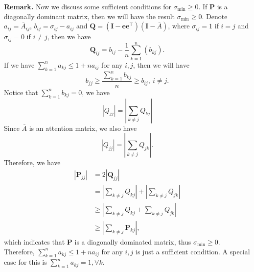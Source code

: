 \documentclass{article}
\def\ve{{\bm{e}}}
\def\mI{{\bm{I}}}
\def\mP{{\bm{P}}}
\def\mQ{{\bm{Q}}}
\theoremstyle{definition}
\theoremstyle{remark}
\theoremstyle{theorem}
\begin{document}
\textbf{Remark.} Now we discuss some sufficient conditions for $\sigma_{\min}\geq0.$ If $\mP$ is a diagonally dominant matrix, then we will have the result $\sigma_{\min}\geq0.$ Denote $a_{ij}=\bar{A}_{ij}$, $b_{ij}=\sigma_{ij}-a_{ij}$ and $\mQ=(\mI-\ve\ve^{\top})(\mI-\bar{A})$, where $\sigma_{ij}=1$ if $i=j$ and $\sigma_{ij}=0$ if $i\neq j$, then we have
\begin{equation}
    \mQ_{ij}=b_{ij}-\frac{1}{n}\sum_{k=1}^n(b_{kj}).
\end{equation}
If we have $\sum_{k=1}^na_{kj}\leq 1+na_{ij}$ for any $i,j$, then we will have
\begin{equation}
    b_{jj}\geq\frac{\sum_{k=1}^nb_{kj}}{n}\geq b_{ij},\ i\neq j .
\end{equation}
Notice that $\sum_{k=1}^nb_{kj}=0$, we have
\begin{equation}
    |Q_{jj}|=|\sum_{k\neq j}Q_{kj}|
\end{equation}
Since $\bar{A}$ is an attention matrix, we also have
\begin{equation}
    |Q_{jj}|=|\sum_{k\neq j}Q_{jk}|.
\end{equation}
Therefore, we have
\begin{equation}
    \begin{aligned}
        |\mP_{jj}|&=2|\mQ_{jj}|\\
        &=|\sum_{k\neq j}Q_{kj}|+|\sum_{k\neq j}Q_{jk}|\\
        &\geq |\sum_{k\neq j}Q_{kj}+\sum_{k\neq j}Q_{jk}|\\
        &\geq |\sum_{k\neq j}\mP_{kj}|,
    \end{aligned}
\end{equation}
which indicates that $\mP$ is a diagonally dominated matrix, thus $\sigma_{\min}\geq 0.$ Therefore, $\sum_{k=1}^na_{kj}\leq 1+na_{ij}$ for any $i,j$ is just a sufficient condition. A special case for this is $\sum_{k=1}^na_{kj}=1, \forall k$.
\end{document}
